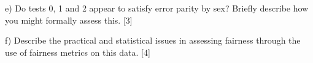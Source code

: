 \documentclass[a4paper, 11pt]{article}
\begin{document}
e) Do tests 0, 1 and 2 appear to satisfy error parity by sex? Briefly describe how you might formally assess this. [3]

%
%
%

f) Describe the practical and statistical issues in assessing fairness through the use of fairness metrics on this data. [4]

%
%
%
%
\end{document}
